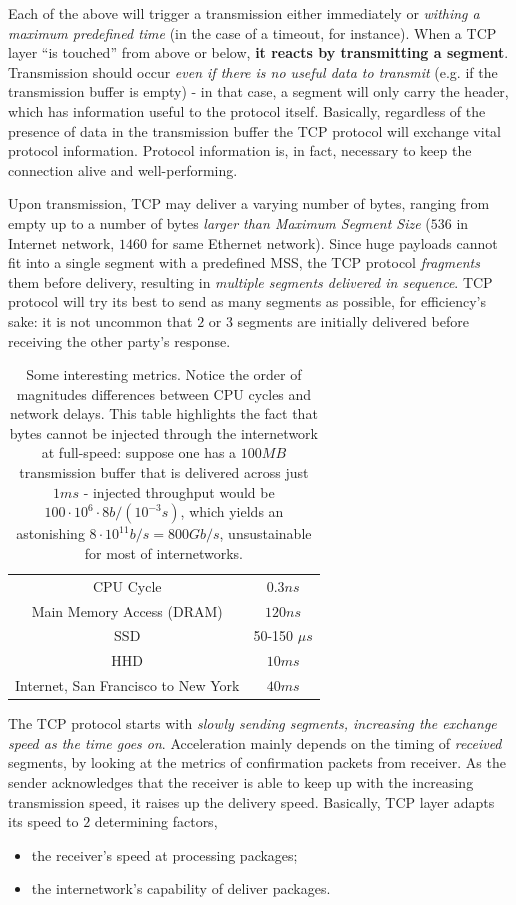 \documentclass[10pt]{extbook}
\begin{document}
Each of the above will trigger a transmission either immediately or
\emph{withing a maximum predefined time} (in the case of a timeout, for
instance). When a TCP layer ``is touched'' from above or below, \textbf{it reacts
by transmitting a segment}. Transmission should occur \emph{even if there is no
useful data to transmit} (e.g. if the transmission buffer is empty) \-- in that
case, a segment will only carry the header, which has information useful to the
protocol itself. Basically, regardless of the presence of data in the
transmission buffer the TCP protocol will exchange vital protocol information.
Protocol information is, in fact, necessary to keep the connection alive and
well-performing.

Upon transmission, TCP may deliver a varying number of bytes, ranging from
empty up to a number of bytes \emph{larger than Maximum Segment Size} ($536$ in
Internet network, $1460$ for same Ethernet network). Since huge payloads cannot
fit into a single segment with a predefined MSS, the TCP protocol
\emph{fragments} them before delivery, resulting in \emph{multiple segments
delivered in sequence}. TCP protocol will try its best to send as many segments
as possible, for efficiency's sake: it is not uncommon that $2$ or $3$ segments
are initially delivered before receiving the other party's response.

\begin{table}[ht]
\centering
\begin{tabular}{cc}
CPU Cycle & $0.3 ns$ \\
Main Memory Access (DRAM) & $120ns$ \\
SSD & 50-150 $\mu s$ \\
HHD & $10 ms$ \\
Internet, San Francisco to New York & $40ms$
\end{tabular}
\caption{Some interesting metrics. Notice the order of magnitudes differences
between CPU cycles and network delays. This table highlights the fact that
bytes cannot be injected through the internetwork at full\--speed: suppose one
has a $100MB$ transmission buffer that is delivered across just $1ms$ \--
injected throughput would be $100 \cdot 10^6 \cdot 8 b/(10^{-3} s)$, which
yields an astonishing $8 \cdot 10^{11} b/s = 800 Gb/s$, unsustainable for most
of internetworks.}
\label{tab:SomeMetrics}
\end{table}
\bigskip

The TCP protocol starts with \emph{slowly sending segments, increasing the exchange
speed as the time goes on}. Acceleration mainly depends on the timing of
\emph{received} segments, by looking at the metrics of confirmation packets
from receiver. As the sender acknowledges that the receiver is able to keep up
with the increasing transmission speed, it raises up the delivery speed. Basically, TCP layer adapts its speed to $2$ determining factors,
\begin{itemize}
    \item the receiver's speed at processing packages;
    \item the internetwork's capability of deliver packages.
\end{itemize}
\end{document}
